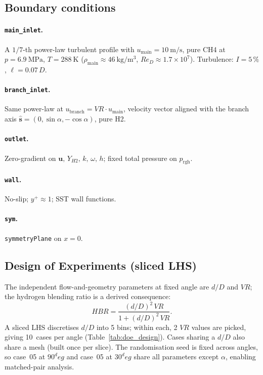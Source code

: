 \documentclass[10pt,a4paper]{article}
\def\Hi{H2}%
\def\CHi{CH4}%
\def\dD{d/D}%
\def\VR{VR}%
\def\HBR{HBR}%
\def\circ{ deg}%
\newcommand{\Hi}{\ensuremath{\mathrm{H_2}}}
\newcommand{\CHi}{\ensuremath{\mathrm{CH_4}}}
\newcommand{\dD}{\ensuremath{d/D}}
\newcommand{\VR}{\ensuremath{\mathrm{VR}}}
\newcommand{\HBR}{\ensuremath{\mathrm{HBR}}}
\begin{document}
\subsection{Boundary conditions}
\label{sec:method_bc}

\paragraph{\texttt{main\_inlet}.}\;
A \(1/7\)-th power-law turbulent profile with
\(u_{\mathrm{main}}=\SI{10}{\meter\per\second}\), pure \CHi{} at
\(p=\SI{6.9}{\mega\pascal}\), \(T=\SI{288}{\kelvin}\)
(\(\rho_{\mathrm{main}}\approx\SI{46}{\kilogram\per\meter\cubed}\),
\(Re_D\approx 1.7\times 10^{7}\)).
Turbulence: \(I=5\,\%\), \(\ell=0.07\,D\).

\paragraph{\texttt{branch\_inlet}.}\;
Same power-law at \(u_{\mathrm{branch}}=\VR\cdot u_{\mathrm{main}}\),
velocity vector aligned with the branch axis
\(\hat{\mathbf{s}}=(0,\sin\alpha,-\cos\alpha)\), pure \Hi{}.

\paragraph{\texttt{outlet}.}\;
Zero-gradient on \(\mathbf{u},\,Y_{\Hi},\,k,\,\omega,\,h\); fixed
total pressure on \(p_{\mathrm{rgh}}\).

\paragraph{\texttt{wall}.}\;
No-slip; \(y^+\!\approx\!1\); SST wall functions.

\paragraph{\texttt{sym}.}\;
\texttt{symmetryPlane} on \(x=0\).

\subsection{Design of Experiments (sliced LHS)}
\label{sec:method_doe}
The independent flow-and-geometry parameters at fixed angle are
\(\dD\) and \(\VR\); the hydrogen blending ratio is a derived
consequence:
\begin{equation}
\HBR = \frac{(\dD)^{2}\,\VR}{1+(\dD)^{2}\,\VR}.
\label{eq:hbr}
\end{equation}
A sliced LHS \citep{ye2000sliced} discretises \(\dD\) into 5
bins; within each, 2 \(\VR\) values are picked, giving 10~cases
per angle (Table~\ref{tab:doe_design}).
Cases sharing a \(\dD\) also share a mesh (built once per slice).
The randomisation seed is fixed across angles, so case~05 at
\(90^\circ\) and case~05 at \(30^\circ\) share all parameters
except \(\alpha\), enabling matched-pair analysis.
\end{document}
